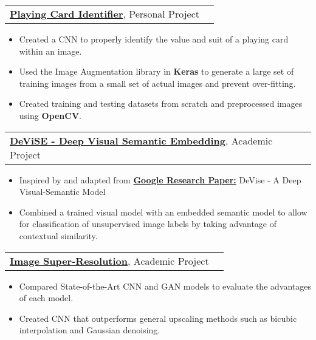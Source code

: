 \documentclass[letterpaper,11pt]{article}
\makeatletter
\newcommand{\projtitle}[2]{
  \vspace{7pt}
  \begin{tabular*}{1.00\textwidth}[t]{l@{\extracolsep{\fill}}r}
    \textbf{#1}, #2 \\
  \end{tabular*}\vspace{-5pt}
}
\newcommand{\expstart}{\begin{itemize}[leftmargin=5mm]}
\newcommand{\expend}{\end{itemize}\vspace{-5pt}}
\newcommand{\expitem}[1]{\item\small{{#1 \vspace{-5pt}}}}
\makeatother
\begin{document}
    \projtitle{\href{https://github.com/jth1011/Playing-Card-Identifier}{Playing Card Identifier}}{Personal Project}
  \expstart
    \expitem{Created a CNN to properly identify the value and suit of a playing card within an image.}
    \expitem{Used the Image Augmentation library in \textbf{Keras} to generate a large set of training images from a small set of actual images and prevent over-fitting.}
    \expitem{Created training and testing datasets from scratch and preprocessed images using \textbf{OpenCV}.}
  \expend
 
  \projtitle{\href{https://github.com/jth1011}{DeViSE - Deep Visual Semantic Embedding}}{Academic Project}
  \expstart
    \expitem{Inspired by and adapted from \href{http://www.cs.toronto.edu/~ranzato/publications/frome_nips2013.pdf}{\textbf{Google Research Paper:}}}DeVise - A Deep Visual-Semantic Model
    \expitem{Combined a trained visual model with an embedded semantic model to allow for classification of unsupervised image labels by taking advantage of contextual similarity.}
  \expend
  
  \projtitle{\href{https://github.com/jth1011}{Image Super-Resolution}}{Academic Project}
  \expstart
    \expitem{Compared State-of-the-Art CNN and GAN models to evaluate the advantages of each model.}
    \expitem{Created CNN that outperforms general upscaling methods such as bicubic interpolation and Gaussian denoising.}
  \expend


\end{document}
